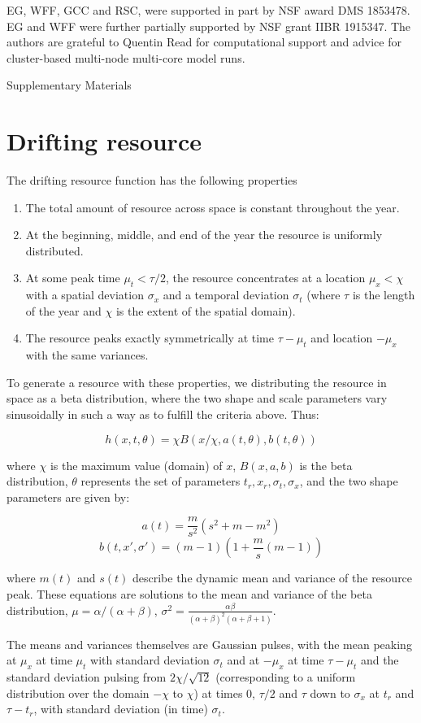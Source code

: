 \documentclass[12pt]{article}
\begin{document}
EG, WFF, GCC and RSC, were supported in part by NSF award DMS 1853478. EG and WFF were further partially supported by NSF grant IIBR 1915347. The authors are grateful to Quentin Read for computational support and advice for cluster-based multi-node multi-core model runs. 

\nolinenumbers



\linenumbers

\clearpage
\begin{center}
	\Large Supplementary Materials
	\end{center}

\normalsize
\appendix
\section{Drifting resource}
The drifting resource function has the following properties

\begin{enumerate}
\item The total amount of resource across space is constant throughout the year.
\item At the beginning, middle, and end of the year the resource is uniformly distributed. 
\item At some peak time $\mu_t < \tau/2$, the resource concentrates at a location $\mu_x < \chi$ with a spatial deviation $\sigma_x$ and a temporal deviation $\sigma_t$ (where $\tau$ is the length of the year and $\chi$ is the extent of the spatial domain).
\item The resource peaks exactly symmetrically at time $\tau - \mu_t$ and location $-\mu_x$ with the same variances.
\end{enumerate}

To generate a resource with these properties, we distributing the resource in space as a beta distribution, where the two shape and scale parameters vary sinusoidally in such a way as to fulfill the criteria above.  Thus:

$$h(x,t, \theta) = \chi B(x/\chi, a(t, \theta), b(t, \theta))$$

where $\chi$ is the maximum value (domain) of $x$, $B(x, a, b)$ is the beta distribution, $\theta$ represents the set of parameters $t_r, x_r, \sigma_t, \sigma_x$, and the two shape parameters are given by:

$$a(t) = \frac{m}{s^2}( s^2 + m - m^2)$$
$$b(t, x', \sigma') = (m-1)\left(1 + \frac{m}{s}(m-1)\right) $$

where $m(t)$ and $s(t)$ describe the dynamic mean and variance of the resource peak.  These equations are solutions to the mean and variance of the beta distribution, $\mu = \alpha/(\alpha + \beta)$, $\sigma^2 = \frac{\alpha\beta}{(\alpha+\beta)^2(\alpha+\beta+1)}$.

The means and variances themselves are Gaussian pulses, with the mean peaking at $\mu_x$ at time $\mu_t$ with standard deviation $\sigma_t$ and at $-\mu_x$ at time $\tau - \mu_t$ and the standard deviation pulsing from $2 \chi/\sqrt{12}$ (corresponding to a uniform distribution over the domain $-\chi$ to $\chi$) at times 0, $\tau/2$ and $\tau$ down to $\sigma_x$ at $t_r$ and $\tau - t_r$, with standard deviation (in time) $\sigma_t$. 
\end{document}
